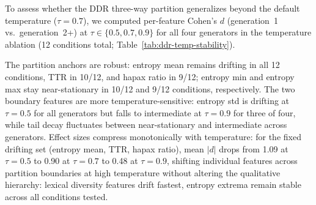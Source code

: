 To assess whether the DDR three-way partition generalizes beyond the default temperature ($\tau{=}0.7$), we computed per-feature Cohen's $d$ (generation~1 vs.\ generation~2+) at $\tau \in \{0.5, 0.7, 0.9\}$ for all four generators in the temperature ablation (12 conditions total; Table~\ref{tab:ddr-temp-stability}).

\begin{table}[H]
\centering
\small
\caption{Mean $|d|$ (gen-1 vs.\ gen-2+) across 4 generators at each temperature. Partition labels: \textbf{D}rifting ($|d|>0.5$), \textbf{I}ntermediate ($0.1{<}|d|{<}0.5$), near-\textbf{S}tationary ($|d|{<}0.1$). Boldface marks features that shift from their $\tau{=}0.7$ partition.}
\label{tab:ddr-temp-stability}
\end{table}

The partition anchors are robust: entropy mean remains drifting in all 12 conditions, TTR in 10/12, and hapax ratio in 9/12; entropy min and entropy max stay near-stationary in 10/12 and 9/12 conditions, respectively.
The two boundary features are more temperature-sensitive: entropy std is drifting at $\tau{=}0.5$ for all generators but falls to intermediate at $\tau{=}0.9$ for three of four, while tail decay fluctuates between near-stationary and intermediate across generators.
Effect sizes compress monotonically with temperature: for the fixed drifting set (entropy mean, TTR, hapax ratio), mean $|d|$ drops from 1.09 at $\tau{=}0.5$ to 0.90 at $\tau{=}0.7$ to 0.48 at $\tau{=}0.9$, shifting individual features across partition boundaries at high temperature without altering the qualitative hierarchy: lexical diversity features drift fastest, entropy extrema remain stable across all conditions tested.
